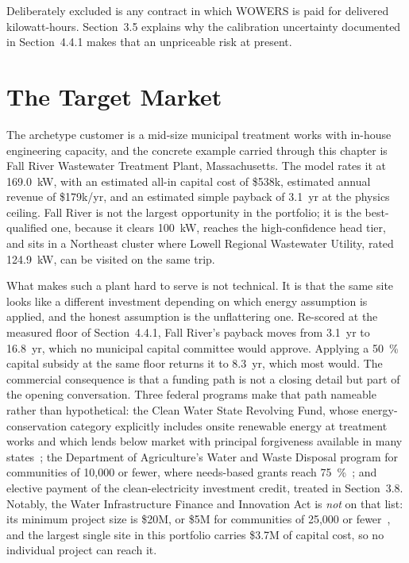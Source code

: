 \documentclass[12pt,letterpaper]{report}
\begin{document}
Deliberately excluded is any contract in which WOWERS is paid for delivered
kilowatt-hours. Section~3.5 explains why the calibration uncertainty documented in
Section~4.4.1 makes that an unpriceable risk at present.

\section{The Target Market}

The archetype customer is a mid-size municipal treatment works with in-house
engineering capacity, and the concrete example carried through this chapter is
Fall River Wastewater Treatment Plant, Massachusetts. The model rates it at
169.0~kW, with an estimated all-in capital cost of \$538k, estimated annual revenue
of \$179k/yr, and an estimated simple payback of 3.1~yr at the physics ceiling. Fall
River is not the largest opportunity in the portfolio; it is the best-qualified one,
because it clears 100~kW, reaches the high-confidence head tier, and sits in a
Northeast cluster where Lowell Regional Wastewater Utility, rated 124.9~kW, can be
visited on the same trip.

What makes such a plant hard to serve is not technical. It is that the same site
looks like a different investment depending on which energy assumption is applied,
and the honest assumption is the unflattering one. Re-scored at the measured floor
of Section~4.4.1, Fall River's payback moves from 3.1~yr to 16.8~yr, which no
municipal capital committee would approve. Applying a 50~\% capital subsidy at the
same floor returns it to 8.3~yr, which most would. The commercial consequence is
that a funding path is not a closing detail but part of the opening conversation.
Three federal programs make that path nameable rather than hypothetical: the Clean
Water State Revolving Fund, whose energy-conservation category explicitly includes
onsite renewable energy at treatment works and which lends below market with
principal forgiveness available in many states~\cite{epa_cwsrf_energy}; the
Department of Agriculture's Water and Waste Disposal program for communities of
10,000 or fewer, where needs-based grants reach 75~\%~\cite{usda_rd_wwd}; and
elective payment of the clean-electricity investment credit, treated in
Section~3.8. Notably, the Water Infrastructure Finance and Innovation Act is
\emph{not} on that list: its minimum project size is \$20M, or \$5M for communities
of 25,000 or fewer~\cite{epa_wifia}, and the largest single site in this portfolio
carries \$3.7M of capital cost, so no individual project can reach it.
\end{document}

